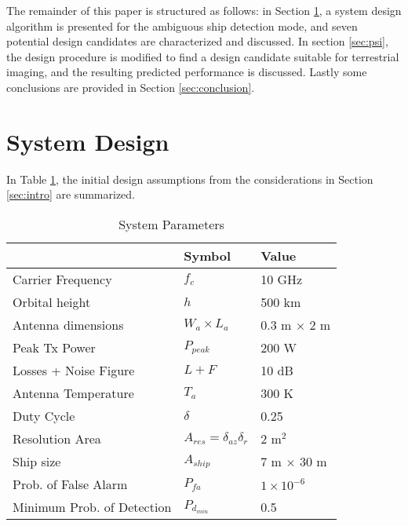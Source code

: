 \documentclass[conference,a4paper]{IEEEtran}
\begin{document}
    The remainder of this paper is structured as follows: in Section \ref{sec:systemDesign}, a system design algorithm is presented for the ambiguous ship detection mode, and seven potential design candidates are characterized and discussed.
    In section \ref{sec:psi}, the design procedure is modified to find a design candidate suitable for terrestrial imaging, and the resulting predicted performance is discussed.
    Lastly some conclusions are provided in Section \ref{sec:conclusion}.


    \section{System Design}
    \label{sec:systemDesign}

    In Table \ref{tab:parameters}, the initial design assumptions from the considerations in Section \ref{sec:intro} are summarized.
    \begin{table}[h]
        \caption{System Parameters}
        \label{tab:parameters}
        \centering
        \begin{tabular}{|l|l|l|}
            \hline
            & \textbf{Symbol}                       & \textbf{Value}     \\ \hline
            Carrier Frequency          & $f_c$                                 & 10 GHz             \\ \hline
            Orbital height             & $h$                                   & 500 km             \\ \hline
            Antenna dimensions         & $W_a \times L_a$                      & 0.3 m $\times$ 2 m \\ \hline
            Peak Tx Power              & $P_{peak}$                            & 200 W              \\ \hline
            Losses + Noise Figure      & $L+F$                                 & 10 dB              \\ \hline
            Antenna Temperature        & $T_a$                                 & 300 K              \\ \hline
            Duty Cycle                 & $\delta$                              & 0.25               \\ \hline
            Resolution Area            & $A_{res}=\delta_{az}\delta_{r}$       & 2 m$^2$            \\ \hline
            Ship size                  & $A_{ship}$                            & 7 m $\times$ 30 m  \\ \hline
            Prob. of False Alarm       & $P_{fa}$                              & $1\times 10^{-6}$  \\ \hline
            Minimum Prob. of Detection & $P_{d_{min}}$ \rule[-1.1mm]{0mm}{1mm} & 0.5                \\ \hline
        \end{tabular}
    \end{table}
\end{document}
